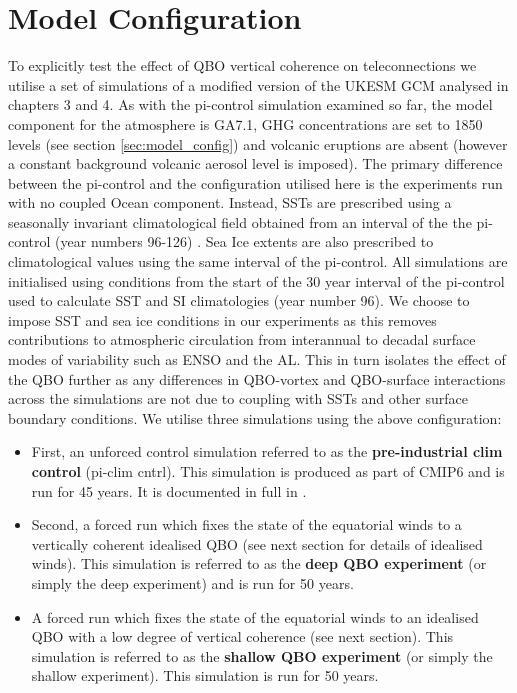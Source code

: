 \section{Model Configuration}

To explicitly test the effect of QBO vertical coherence on teleconnections we utilise a set of simulations of a modified version of the UKESM GCM analysed in chapters 3 and 4. As with the pi-control simulation examined so far, the model component for the atmosphere is GA7.1, GHG concentrations are set to 1850 levels (see section \ref{sec:model_config}) and volcanic eruptions are absent (however a constant background volcanic aerosol level is imposed). The primary difference between the pi-control and the configuration utilised here is the experiments run with no coupled Ocean component. Instead, SSTs are prescribed using a seasonally invariant climatological field obtained from an interval of the the pi-control (year numbers 96-126) \cite{oconnorAssessment2021}. Sea Ice extents are also prescribed to climatological values using the same interval of the pi-control. All simulations are initialised using conditions from the start of the 30 year interval of the pi-control used to calculate SST and SI climatologies (year number 96). We choose to impose SST and sea ice conditions in our experiments as this removes contributions to atmospheric circulation from interannual to decadal surface modes of variability such as ENSO and the AL. This in turn isolates the effect of the QBO further as any differences in QBO-vortex and QBO-surface interactions across the simulations are not due to coupling with SSTs and other surface boundary conditions. We utilise three simulations using the above configuration:

\begin{itemize}
    \item First, an unforced control simulation referred to as the \textbf{pre-industrial clim control} (pi-clim cntrl). This simulation is produced as part of CMIP6 and is run for 45 years. It is documented in full in \cite{oconnorAssessment2021b}. 
    
    \item Second, a forced run which fixes the state of the equatorial winds to a vertically coherent idealised QBO (see next section for details of idealised winds). This simulation is referred to as the \textbf{deep QBO experiment} (or simply the deep experiment) and is run for 50 years.
    
    \item A forced run which fixes the state of the equatorial winds to an idealised QBO with a low degree of vertical coherence (see next section). This simulation is referred to as the \textbf{shallow QBO experiment} (or simply the shallow experiment). This simulation is run for 50 years.
    
\end{itemize}

